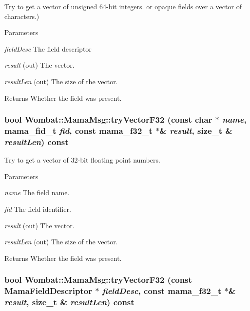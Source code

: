 Try to get a vector of unsigned 64-\/bit integers. or opaque fields over a vector of characters.) 
\begin{DoxyParams}{Parameters}
\item[{\em fieldDesc}]The field descriptor \item[{\em result}](out) The vector. \item[{\em resultLen}](out) The size of the vector. \end{DoxyParams}
\begin{DoxyReturn}{Returns}
Whether the field was present. 
\end{DoxyReturn}
\hypertarget{classWombat_1_1MamaMsg_aa2177d08e01fbad486659f167b6ac1aa}{
\subsubsection[{tryVectorF32}]{\setlength{\rightskip}{0pt plus 5cm}bool Wombat::MamaMsg::tryVectorF32 (const char $\ast$ {\em name}, \/  mama\_\-fid\_\-t {\em fid}, \/  const mama\_\-f32\_\-t $\ast$\& {\em result}, \/  size\_\-t \& {\em resultLen}) const}}
\label{classWombat_1_1MamaMsg_aa2177d08e01fbad486659f167b6ac1aa}


Try to get a vector of 32-\/bit floating point numbers. 
\begin{DoxyParams}{Parameters}
\item[{\em name}]The field name. \item[{\em fid}]The field identifier. \item[{\em result}](out) The vector. \item[{\em resultLen}](out) The size of the vector. \end{DoxyParams}
\begin{DoxyReturn}{Returns}
Whether the field was present. 
\end{DoxyReturn}
\hypertarget{classWombat_1_1MamaMsg_acdc51528232649cf901eab7dc845c976}{
\subsubsection[{tryVectorF32}]{\setlength{\rightskip}{0pt plus 5cm}bool Wombat::MamaMsg::tryVectorF32 (const {\bf MamaFieldDescriptor} $\ast$ {\em fieldDesc}, \/  const mama\_\-f32\_\-t $\ast$\& {\em result}, \/  size\_\-t \& {\em resultLen}) const}}
\label{classWombat_1_1MamaMsg_acdc51528232649cf901eab7dc845c976}



